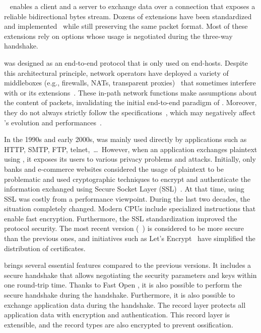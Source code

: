 


\tcp~\cite{rfc793} enables a client and a server to exchange data
over a connection that exposes a reliable bidirectional bytes stream.
Dozens of \tcp extensions have been standardized and implemented~\cite{RFC7414}
while still preserving the same packet format. Most of these extensions rely on
\tcp options whose usage is negotiated during the three-way handshake.

\tcp was designed as an end-to-end protocol that is only used on end-hosts.
Despite this architectural principle, network operators have deployed a variety
of middleboxes (e.g., firewalls, NATs, transparent proxies)~\cite{mCloud} that
sometimes interfere with \tcp or its extensions~\cite{medina2004measuring,
honda2011still, edeline2019bottom}. These in-path network functions make
assumptions about the content of \tcp packets, invalidating the initial
end-to-end paradigm of \tcp. Moreover, they do not always strictly follow the
\tcp specifications~\cite{honda2011still, hesmans2013tcp}, which may negatively
affect \tcp's evolution and performances~\cite{edeline2020evaluating}.


In the 1990s and early 2000s, \tcp was mainly used directly by applications such
as HTTP, SMTP, FTP, telnet,~\ldots~However, when an application exchanges
plaintext using \tcp, it exposes its users to various privacy problems and
attacks. Initially, only banks and e-commerce websites considered the usage of
plaintext to be problematic and used cryptographic techniques to encrypt and
authenticate the information exchanged using Secure Socket Layer
(SSL)~\cite{draft-hickman-netscape-ssl}. At that time, using SSL was costly from
a performance viewpoint. During the last two decades, the situation completely
changed. Modern CPUs include specialized instructions that enable fast
encryption. Furthermore, the SSL standardization improved the protocol security.
The most recent version (~\cite{rfc8446}) is considered to be more
secure than the previous ones, and initiatives such as Let's Encrypt~\cite{aas2019let} have simplified the distribution of certificates.

 brings several essential features compared to the previous versions. It
includes a secure handshake that allows negotiating the security parameters and
keys within one round-trip time. Thanks to \tcp Fast Open
\cite{radhakrishnan2011tcp}, it is also possible to perform the secure handshake
during the \tcp handshake. Furthermore, it is also possible to exchange
application data during the handshake. The  record layer protects all
application data with encryption and authentication. This record layer is
extensible, and the \tls record types are also encrypted to prevent
ossification.

